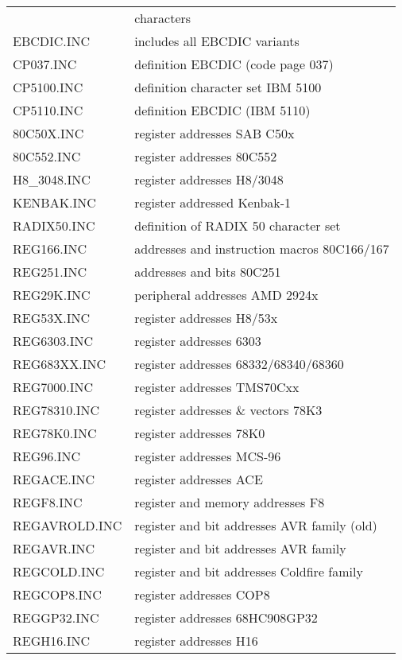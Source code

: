 \documentclass[12pt,twoside]{report}
\begin{document}
\begin{center}
\begin{longtable}{|l|l|}
                  & characters \\
EBCDIC.INC        & includes all EBCDIC variants \\
CP037.INC         & definition EBCDIC (code page 037) \\
CP5100.INC        & definition character set IBM 5100 \\
CP5110.INC        & definition EBCDIC (IBM 5110) \\
80C50X.INC        & register addresses SAB C50x \\
80C552.INC        & register addresses 80C552 \\
H8\_3048.INC      & register addresses H8/3048 \\
KENBAK.INC        & register addressed Kenbak-1 \\
RADIX50.INC       & definition of RADIX 50 character set \\
REG166.INC        & addresses and instruction macros 80C166/167 \\
REG251.INC        & addresses and bits 80C251 \\
REG29K.INC        & peripheral addresses AMD 2924x \\
REG53X.INC        & register addresses H8/53x \\
REG6303.INC       & register addresses 6303 \\
REG683XX.INC      & register addresses 68332/68340/68360 \\
REG7000.INC       & register addresses TMS70Cxx \\
REG78310.INC      & register addresses \& vectors 78K3 \\
REG78K0.INC       & register addresses 78K0 \\
REG96.INC         & register addresses MCS-96 \\
REGACE.INC        & register addresses ACE \\
REGF8.INC         & register and memory addresses F8 \\
REGAVROLD.INC     & register and bit addresses AVR family (old)\\
REGAVR.INC        & register and bit addresses AVR family \\
REGCOLD.INC       & register and bit addresses Coldfire family \\
REGCOP8.INC       & register addresses COP8 \\
REGGP32.INC       & register addresses 68HC908GP32 \\
REGH16.INC        & register addresses H16\\

\end{longtable}
\end{center}
\end{document}
